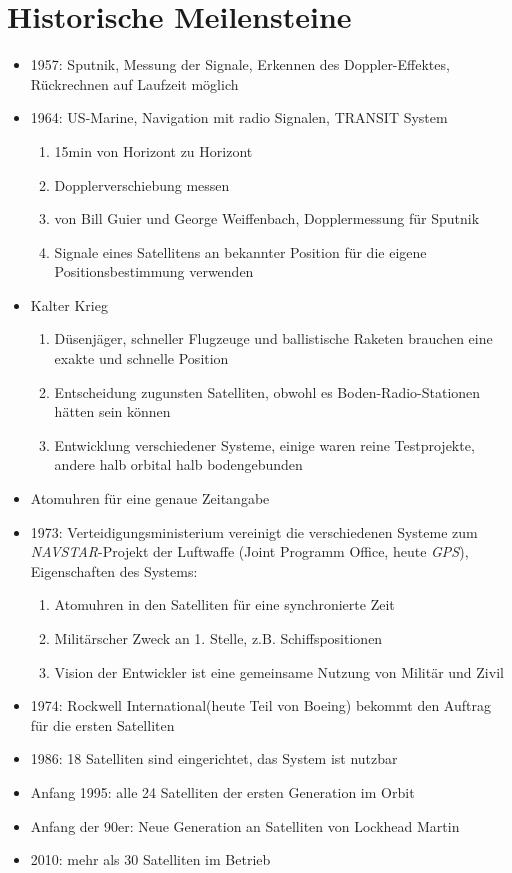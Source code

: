 \documentclass{scrartcl}
\begin{document}
    \section{Historische Meilensteine}
    \begin{itemize}
      \item 1957: Sputnik, Messung der Signale, Erkennen des Doppler-Effektes, Rückrechnen auf Laufzeit möglich
      \item 1964: US-Marine, Navigation mit radio Signalen, TRANSIT System
      \begin{enumerate}
          \item 15min von Horizont zu Horizont
          \item Dopplerverschiebung messen
          \item von Bill Guier und George Weiffenbach, Dopplermessung für Sputnik
          \item Signale eines Satellitens an bekannter Position für die eigene Positionsbestimmung verwenden
      \end{enumerate}
      \item Kalter Krieg
      \begin{enumerate}
          \item Düsenjäger, schneller Flugzeuge und ballistische Raketen brauchen eine exakte und schnelle Position
          \item Entscheidung zugunsten Satelliten, obwohl es Boden-Radio-Stationen hätten sein können
          \item Entwicklung verschiedener Systeme, einige waren reine Testprojekte, andere halb orbital halb bodengebunden
      \end{enumerate}
       \item Atomuhren für eine genaue Zeitangabe
       \item 1973: Verteidigungsministerium vereinigt die verschiedenen Systeme zum \\\textit{NAVSTAR}-Projekt der Luftwaffe (Joint Programm Office, heute \textit{GPS}),\\Eigenschaften des Systems:
       \begin{enumerate}
           \item Atomuhren in den Satelliten für eine synchronierte Zeit
           \item Militärscher Zweck an 1. Stelle, z.B. Schiffspositionen
           \item Vision der Entwickler ist eine gemeinsame Nutzung von Militär und Zivil
       \end{enumerate}
       \item 1974: Rockwell International(heute Teil von Boeing) bekommt den Auftrag für die ersten Satelliten
       \item 1986: 18 Satelliten sind eingerichtet, das System ist nutzbar
       \item Anfang 1995: alle 24 Satelliten der ersten Generation im Orbit
       \item Anfang der 90er: Neue Generation an Satelliten von Lockhead Martin
       \item 2010: mehr als 30 Satelliten im Betrieb
    \end{itemize}
\end{document}
